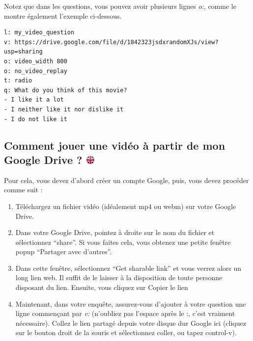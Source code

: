 \documentclass[
]{book}
\providecommand{\tightlist}{%
  \setlength{\itemsep}{0pt}\setlength{\parskip}{0pt}}
\begin{document}
Notez que dans les questions, vous pouvez avoir plusieurs lignes \emph{o:}, comme le montre également l'exemple ci-dessous.

\begin{verbatim}
l: my_video_question
v: https://drive.google.com/file/d/1842323jsdxrandomXJs/view?usp=sharing
o: video_width 800
o: no_video_replay
t: radio
q: What do you think of this movie?
- I like it a lot
- I neither like it nor dislike it
- I do not like it
\end{verbatim}

\hypertarget{comment-jouer-une-viduxe9o-uxe0-partir-de-mon-google-drive}{%
\subsection[Comment jouer une vidéo à partir de mon Google Drive ? ]{\texorpdfstring{Comment jouer une vidéo à partir de mon Google Drive ? \href{https://www.psytoolkit.org/lessons/surveyaudiovideo.html\#_how_to_play_a_video_from_my_google_drive}{\protect\includegraphics{img/ukflag.png}}}{Comment jouer une vidéo à partir de mon Google Drive ? }}\label{comment-jouer-une-viduxe9o-uxe0-partir-de-mon-google-drive}}

Pour cela, vous devez d'abord créer un compte Google, puis, vous devez procéder comme suit :

\begin{enumerate}
\def\labelenumi{\arabic{enumi}.}
\tightlist
\item
  Téléchargez un fichier vidéo (idéalement mp4 ou webm) sur votre Google Drive.
\item
  Dans votre Google Drive, pointez à droite sur le nom du fichier et sélectionnez ``share''. Si vous faites cela, vous obtenez une petite fenêtre popup ``Partager avec d'autres''.
\item
  Dans cette fenêtre, sélectionnez ``Get sharable link'' et vous verrez alors un long lien web. Il suffit de le laisser à la disposition de toute personne disposant du lien. Ensuite, vous cliquez sur Copier le lien
\item
  Maintenant, dans votre enquête, assurez-vous d'ajouter à votre question une ligne commençant par \emph{v: } (n'oubliez pas l'espace après le :, c'est vraiment nécessaire). Collez le lien partagé depuis votre disque dur Google ici (cliquez sur le bouton droit de la souris et sélectionnez coller, ou tapez control-v).
\end{enumerate}
\end{document}
